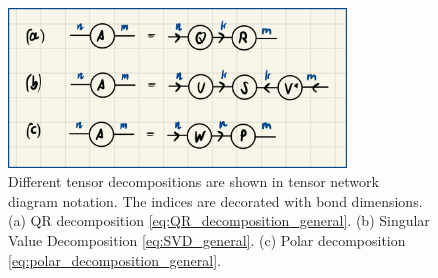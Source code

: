 \begin{figure}
	\centering
	\includegraphics[width=0.8\textwidth]{figures/Tensor_Networks/tensor_decomposition_diagrams.jpeg}
	\caption{Different tensor decompositions are shown in tensor network diagram notation. The indices are decorated with bond dimensions. (a) QR decomposition \eqref{eq:QR_decomposition_general}. (b) Singular Value Decomposition \eqref{eq:SVD_general}. (c) Polar decomposition \eqref{eq:polar_decomposition_general}.}
	\label{fig:tensor_decomposition_diagrams}
\end{figure}